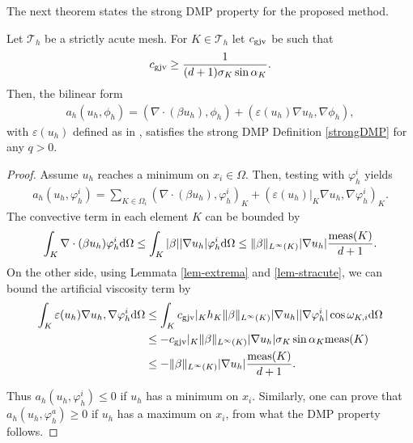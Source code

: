 The next theorem states the strong DMP property for the proposed method.
\begin{theorem}
Let $\mathcal{T}_h$ be a strictly acute mesh. For $K\in \mathcal{T}_h$ let $c_{\rm gjv}$ be such that 
\begin{align}\label{eq-cgjv1}
c_{\rm gjv} \geq \frac{1}{(d+1) \sigma_K \sin \alpha_K}.
\end{align}
Then, the bilinear form
\begin{align}\label{eq-bfgjv}
a_h(u_h,\phi_h) = (\nabla \cdot ( \beta u_h), \phi_h) + (\varepsilon(u_h) \nabla u_h, \nabla \phi_h), 
\end{align}
with $\varepsilon(u_h)$ defined as in , satisfies  the strong DMP Definition \ref{strongDMP}  for any $q>0$.
\end{theorem}
\begin{proof}
Assume $u_h$ reaches a minimum on $x_i\in\Omega$. Then, testing  with $\varphi_h^i$ yields
\begin{align*}
 a_h(u_h,\varphi_h^i) = \sum\limits_{K\in\Omega_i} (\nabla \cdot  (\beta u_h), \varphi_h^i)_K + 
 (\varepsilon(u_h)|_K \nabla u_h, \nabla \varphi_h^i)_K.
\end{align*}
The convective term in each element $K$ can be bounded by
\begin{align*}
\int_K \nabla \cdot (\beta  u_h) \varphi_h^i {\rm d}\Omega \leq \int_K |\beta| |\nabla u_h| \varphi_h^i {\rm d}\Omega \leq \|\beta\|_{L^\infty(K)} |\nabla u_h| \frac{{\rm meas}(K)}{d+1}.
\end{align*}
On the other side, using Lemmata \ref{lem-extrema} and \ref{lem-stracute}, we can bound the artificial viscosity term by
\begin{align*}
\int_K \varepsilon(u_h) \nabla u_h, \nabla \varphi^i_h {\rm d}\Omega &  \leq \int_K c_{\rm gjv}|_K h_K \|\beta\|_{L^\infty(K)} |\nabla u_h| |\nabla \varphi_h^i| \cos \omega_{K,i}{\rm d}\Omega\\
&  \leq - c_{\rm gjv}|_K \|\beta\|_{L^\infty(K)} |\nabla u_h| \sigma_K \sin \alpha_K  {\rm meas}(K) \\
& \leq - \|\beta\|_{L^\infty(K)} |\nabla u_h| \frac{{\rm meas}(K)}{d+1}.
\end{align*}

Thus $a_h(u_h,\varphi_h^i) \leq 0$ if $u_h$ has a minimum on $x_i$. Similarly, one can prove that $a_h(u_h,\varphi_h^a) \geq 0$ if $u_h$ has a maximum on $x_i$, from what the DMP property follows.
\end{proof}


